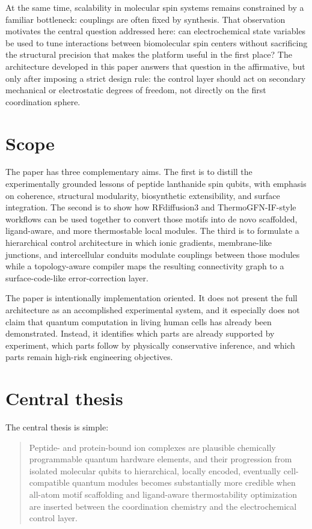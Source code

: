 \documentclass[11pt]{report}
\theoremstyle{definition}
\begin{document}
At the same time, scalability in molecular spin systems remains constrained by a familiar bottleneck: couplings are often fixed by synthesis. That observation motivates the central question addressed here: can electrochemical state variables be used to tune interactions between biomolecular spin centers without sacrificing the structural precision that makes the platform useful in the first place? The architecture developed in this paper answers that question in the affirmative, but only after imposing a strict design rule: the control layer should act on secondary mechanical or electrostatic degrees of freedom, not directly on the first coordination sphere.

\section{Scope}
The paper has three complementary aims. The first is to distill the experimentally grounded lessons of peptide lanthanide spin qubits, with emphasis on coherence, structural modularity, biosynthetic extensibility, and surface integration. The second is to show how RFdiffusion3 and ThermoGFN-IF-style workflows can be used together to convert those motifs into de novo scaffolded, ligand-aware, and more thermostable local modules. The third is to formulate a hierarchical control architecture in which ionic gradients, membrane-like junctions, and intercellular conduits modulate couplings between those modules while a topology-aware compiler maps the resulting connectivity graph to a surface-code-like error-correction layer.

The paper is intentionally implementation oriented. It does not present the full architecture as an accomplished experimental system, and it especially does not claim that quantum computation in living human cells has already been demonstrated. Instead, it identifies which parts are already supported by experiment, which parts follow by physically conservative inference, and which parts remain high-risk engineering objectives.

\section{Central thesis}
The central thesis is simple:
\begin{quote}
Peptide- and protein-bound ion complexes are plausible chemically programmable quantum hardware elements, and their progression from isolated molecular qubits to hierarchical, locally encoded, eventually cell-compatible quantum modules becomes substantially more credible when all-atom motif scaffolding and ligand-aware thermostability optimization are inserted between the coordination chemistry and the electrochemical control layer.
\end{quote}
\end{document}

